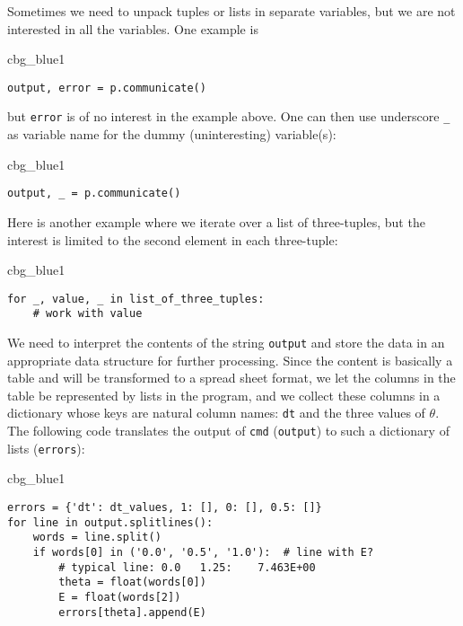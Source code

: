 \documentclass[graybox,sectrefs,envcountresetchap,open=right,final]{svmonodo}
\newenvironment{_cod_tight}[1]{
   \def\FrameCommand{\colorbox{#1}}
   \FrameRule0.6pt\MakeFramed {\FrameRestore}\vskip3mm}
   {\vskip0mm\endMakeFramed}
\newenvironment{cod}[1]{
\bgroup\rmfamily
\fboxsep=0mm\relax
\begin{_cod_tight}{#1}
\list{}{\parsep=-2mm\parskip=0mm\topsep=0pt\leftmargin=2mm
\rightmargin=2\leftmargin\leftmargin=4pt\relax}
\item\relax}
{\endlist\end{_cod_tight}\egroup}
\newenvironment{notice_mdfboxadmon}[1][]{
\begin{notice_mdfboxmdframed}[frametitle=#1]
}
{
\end{notice_mdfboxmdframed}
}
\begin{document}
\begin{notice_mdfboxadmon}
Sometimes we need to unpack tuples or lists in separate variables,
but we are not interested in all the variables. One example is

\begin{cod}{cbg_blue1}\begin{Verbatim}[numbers=none,fontsize=\fontsize{9pt}{9pt},baselinestretch=0.95,xleftmargin=2mm]
output, error = p.communicate()
\end{Verbatim}
\end{cod}
\noindent
but \texttt{error} is of no interest in the example above.
One can then use underscore \Verb!_! as variable name for the dummy
(uninteresting) variable(s):

\begin{cod}{cbg_blue1}\begin{Verbatim}[numbers=none,fontsize=\fontsize{9pt}{9pt},baselinestretch=0.95,xleftmargin=2mm]
output, _ = p.communicate()
\end{Verbatim}
\end{cod}
\noindent
Here is another example where we iterate over a list of three-tuples,
but the interest is limited to the second element in each three-tuple:

\begin{cod}{cbg_blue1}\begin{Verbatim}[numbers=none,fontsize=\fontsize{9pt}{9pt},baselinestretch=0.95,xleftmargin=2mm]
for _, value, _ in list_of_three_tuples:
    # work with value
\end{Verbatim}
\end{cod}
\noindent
\end{notice_mdfboxadmon}



We need to interpret the contents of the string
\texttt{output} and store
the data in an appropriate data structure for further processing.
Since the content is basically a table and will be transformed to
a spread sheet format, we let the columns in the table be represented
by lists in the program,
and we collect these columns in a dictionary whose keys are natural
column names: \texttt{dt} and the three values of $\theta$.
The following code translates the output of \texttt{cmd} (\texttt{output})
to such a dictionary of lists (\texttt{errors}):

\begin{cod}{cbg_blue1}\begin{Verbatim}[numbers=none,fontsize=\fontsize{9pt}{9pt},baselinestretch=0.95,xleftmargin=2mm]
errors = {'dt': dt_values, 1: [], 0: [], 0.5: []}
for line in output.splitlines():
    words = line.split()
    if words[0] in ('0.0', '0.5', '1.0'):  # line with E?
        # typical line: 0.0   1.25:    7.463E+00
        theta = float(words[0])
        E = float(words[2])
        errors[theta].append(E)
\end{Verbatim}
\end{cod}
\noindent
\end{document}
